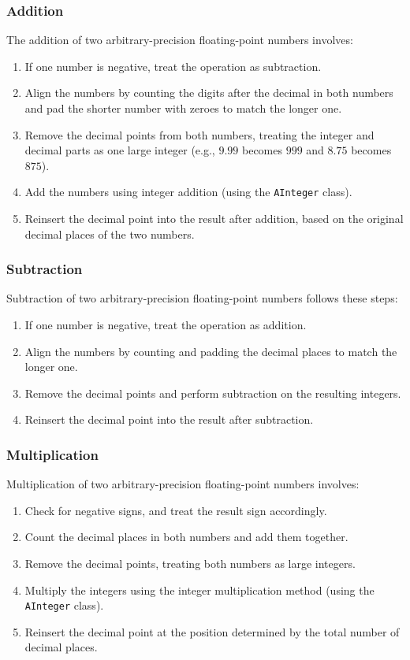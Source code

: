 \documentclass[12pt]{article}
\begin{document}
\subsubsection{Addition}
The addition of two arbitrary-precision floating-point numbers involves:
\begin{enumerate}
    \item If one number is negative, treat the operation as subtraction.
    \item Align the numbers by counting the digits after the decimal in both numbers and pad the shorter number with zeroes to match the longer one.
    \item Remove the decimal points from both numbers, treating the integer and decimal parts as one large integer (e.g., \(9.99\) becomes \(999\) and \(8.75\) becomes \(875\)).
    \item Add the numbers using integer addition (using the \texttt{AInteger} class).
    \item Reinsert the decimal point into the result after addition, based on the original decimal places of the two numbers.
\end{enumerate}


\subsubsection{Subtraction}
Subtraction of two arbitrary-precision floating-point numbers follows these steps:
\begin{enumerate}
    \item If one number is negative, treat the operation as addition.
    \item Align the numbers by counting and padding the decimal places to match the longer one.
    \item Remove the decimal points and perform subtraction on the resulting integers.
    \item Reinsert the decimal point into the result after subtraction.
\end{enumerate}

\subsubsection{Multiplication}
Multiplication of two arbitrary-precision floating-point numbers involves:
\begin{enumerate}
    \item Check for negative signs, and treat the result sign accordingly.
    \item Count the decimal places in both numbers and add them together.
    \item Remove the decimal points, treating both numbers as large integers.
    \item Multiply the integers using the integer multiplication method (using the \texttt{AInteger} class).
    \item Reinsert the decimal point at the position determined by the total number of decimal places.
\end{enumerate}
\end{document}
